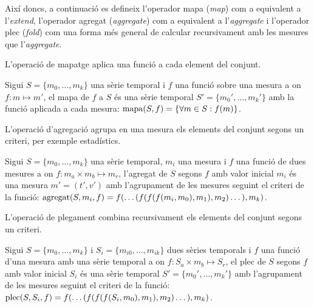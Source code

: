 
Així doncs, a continuació es defineix l'operador mapa (\emph{map}) com
a equivalent a l'\emph{extend}, l'operador agregat (\emph{aggregate})
com a equivalent a l'\emph{aggregate} i l'operador plec (\emph{fold})
com una forma més general de calcular recursivament amb les mesures
que l'\emph{aggregate}.




L'operació de mapatge aplica una funció a cada element del conjunt.
\begin{definition}[mapa]
  Sigui $S=\{m_0, \dotsc, m_k\}$ una sèrie temporal i $f$ una funció
  sobre una mesura a on $f:m\mapsto m'$, el mapa de $f$ a $S$ és una
  sèrie temporal $S'=\{m_0', \dotsc, m_k'\}$ amb la funció aplicada a
  cada mesura: $\operatorname*{mapa}(S,f) = \{\forall m\in S : f(m) \}$.
\end{definition}


L'operació d'agregació agrupa en una mesura els elements del conjunt
segons un criteri, per exemple estadístics.
\begin{definition}[agregat]
  Sigui $S=\{m_0, \dotsc, m_k\}$ una sèrie temporal, $m_i$ una mesura
  i $f$ una funció de dues mesures a on $f: m_a \times m_b \mapsto
  m_r$, l'agregat de $S$ segons $f$ amb valor inicial $m_i$ és una
  mesura $m' = (t',v')$ amb l'agrupament de les mesures seguint el
  criteri de la funció: $\operatorname*{agregat}(S,m_i,f) = f(\dots(
  f(f(f(m_i,m_0),m_1),\allowbreak m_2 )\dots),\allowbreak m_k)$.
\end{definition}



L'operació de plegament combina recursivament els elements del conjunt
segons un criteri.
\begin{definition}[plec]
  Sigui $S=\{m_0, \dotsc, m_k\}$ i $S_i=\{m_{i0}, \dotsc, m_{ik}\}$
  dues sèries temporals i $f$ una funció d'una mesura amb una sèrie
  temporal a on $f: S_a \times m_b \mapsto S_r$, el plec de $S$ segons
  $f$ amb valor inicial $S_i$ és una sèrie temporal $S'= \{m_0',
  \dotsc, m_k'\}$ amb l'agrupament de les mesures seguint el criteri
  de la funció: $\operatorname*{plec}(S,S_i,f) = f(\dots(
  f(f(f(S_i,m_0),m_1),\allowbreak m_2 )\dots),\allowbreak m_k)$.
\end{definition}


